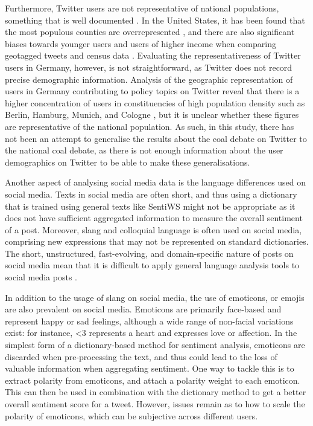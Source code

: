 \documentclass[12pt,onecolumn,twoside]{layout}
\begin{document}
Furthermore, Twitter users are not representative of national populations, something that is well documented \citep{Duggan2015, Mislove2011, Malik2015}. In the United States, it has been found that the most populous counties are overrepresented \citep{Mislove2011}, and there are also significant biases towards younger users and users of higher income when comparing geotagged tweets and census data \citep{Malik2015}. Evaluating the representativeness of Twitter users in Germany, however, is not straightforward, as Twitter does not record precise demographic information. Analysis of the geographic representation of users in Germany contributing to policy topics on Twitter reveal that there is a higher concentration of users in constituencies of high population density such as Berlin, Hamburg, Munich, and Cologne \citep{Fernandez2014}, but it is unclear whether these figures are representative of the national population. As such, in this study, there has not been an attempt to generalise the results about the coal debate on Twitter to the national coal debate, as there is not enough information about the user demographics on Twitter to be able to make these generalisations.

Another aspect of analysing social media data is the language differences used on social media. Texts in social media are often short, and thus using a dictionary that is trained using general texts like SentiWS might not be appropriate as it does not have sufficient aggregated information to measure the overall sentiment of a post. Moreover, slang and colloquial language is often used on social media, comprising new expressions that may not be represented on standard dictionaries. The short, unstructured, fast-evolving, and domain-specific nature of posts on social media mean that it is difficult to apply general language analysis tools to social media posts \citep{Hu2013}.

In addition to the usage of slang on social media, the use of emoticons, or emojis are also prevalent on social media. Emoticons are primarily face-based and represent happy or sad feelings, although a wide range of non-facial variations exist: for instance, <3 represents a heart and expresses love or affection. In the simplest form of a dictionary-based method for sentiment analysis, emoticons are discarded when pre-processing the text, and thus could lead to the loss of valuable information when aggregating sentiment. One way to tackle this is to extract polarity from emoticons, and attach a polarity weight to each emoticon. This can then be used in combination with the dictionary method to get a better overall sentiment score for a tweet. However, issues remain as to how to scale the polarity of emoticons, which can be subjective across different users.
\end{document}

